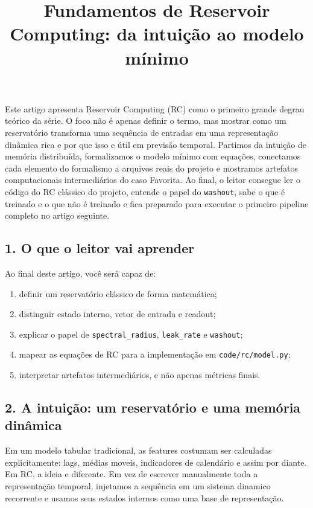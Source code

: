 \documentclass[12pt]{article}
\title{Fundamentos de Reservoir Computing: da intuição ao modelo mínimo}
\author{}
\providecommand{\tightlist}{%
  \setlength{\itemsep}{0pt}\setlength{\parskip}{0pt}}
\begin{document}
\maketitle

\begin{resumo}
Este artigo apresenta Reservoir Computing (RC) como o primeiro grande degrau teórico da série. O foco não é apenas definir o termo, mas mostrar como um reservatório transforma uma sequência de entradas em uma representação dinâmica rica e por que isso e útil em previsão temporal. Partimos da intuição de memória distribuída, formalizamos o modelo mínimo com equações, conectamos cada elemento do formalismo a arquivos reais do projeto e mostramos artefatos computacionais intermediários do caso Favorita. Ao final, o leitor consegue ler o código do RC clássico do projeto, entende o papel do \texttt{washout}, sabe o que é treinado e o que não é treinado e fica preparado para executar o primeiro pipeline completo no artigo seguinte.
\end{resumo}

\subsection{1. O que o leitor vai aprender}\label{1-o-que-o-leitor-vai-aprender}

Ao final deste artigo, você será capaz de:

\begin{enumerate}
\def\labelenumi{\arabic{enumi}.}
\tightlist
\item
  definir um reservatório clássico de forma matemática;
\item
  distinguir estado interno, vetor de entrada e readout;
\item
  explicar o papel de \texttt{spectral\_radius}, \texttt{leak\_rate} e \texttt{washout};
\item
  mapear as equações de RC para a implementação em \texttt{code/rc/model.py};
\item
  interpretar artefatos intermediários, e não apenas métricas finais.
\end{enumerate}

\subsection{2. A intuição: um reservatório e uma memória dinâmica}\label{2-a-intuiuxe7uxe3o-um-reservatuxf3rio-e-uma-memuxf3ria-dinuxe2mica}

Em um modelo tabular tradicional, as features costumam ser calculadas explicitamente: lags, médias moveis, indicadores de calendário e assim por diante. Em RC, a ideia e diferente. Em vez de escrever manualmente toda a representação temporal, injetamos a sequência em um sistema dinamico recorrente e usamos seus estados internos como uma base de representação.
\end{document}
